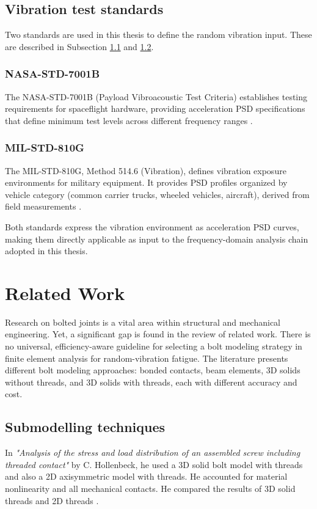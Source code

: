\documentclass[a4paper,twoside]{bth}
\begin{document}
\section{Vibration test standards} \label{sec:standards}
Two standards are used in this thesis to define the random vibration input. These are described in Subsection \ref{NASA} and \ref{T43A}.

\subsection{NASA-STD-7001B} \label{NASA}

The NASA-STD-7001B (Payload Vibroacoustic Test Criteria) establishes testing requirements for spaceflight hardware, providing acceleration \ac{PSD} specifications that define minimum test levels across different frequency ranges \cite{NASA_STD_7001B_2017}.

\subsection{MIL-STD-810G} \label{T43A}

The MIL-STD-810G, Method 514.6 (Vibration), defines vibration exposure environments for military equipment.
It provides \ac{PSD} profiles organized by vehicle category (common carrier trucks, wheeled vehicles, aircraft), derived from field measurements \cite{MIL_STD_810G_2008}.

Both standards express the vibration environment as acceleration \ac{PSD} curves, making them directly applicable as input to the frequency-domain analysis chain adopted in this thesis.

\chapter{Related Work} \label{chp:relatedwork}

Research on bolted joints is a vital area within structural and mechanical engineering. Yet, a significant gap is found in the review of related work. There is no universal, efficiency-aware guideline for selecting a bolt modeling strategy in finite element analysis for random-vibration fatigue. The literature presents different bolt modeling approaches: bonded contacts, beam elements, 3D solids without threads, and 3D solids with threads, each with different accuracy and cost.

\section{Submodelling techniques}
In \textit{"Analysis of the stress and load distribution of an assembled screw including threaded contact"} by C. Hollenbeck, he used a 3D solid bolt model with threads and also a 2D axisymmetric model with threads. He accounted for material nonlinearity and all mechanical contacts. He compared the results of 3D solid threads and 2D threads \cite{Hollenbeck2023AssembledScrew}.
\end{document}
